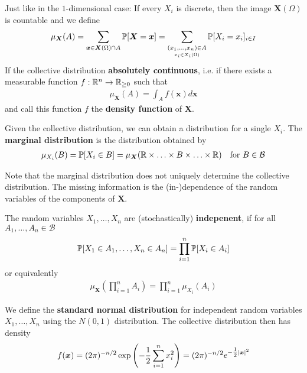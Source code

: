 Just like in the $1$-dimensional case: 
If every $X_i$ is discrete, then the image $\bm{X}(\Omega)$ is countable and we define
\begin{align*}
  \mu_{\bm{X}}(A) = \sum_{\bm{x} \in \bm{X}(\Omega) \cap A} \mathbb{P}[\bm{X} = \bm{x}] = \sum_{\underset{x_i \in X_i(\Omega)}{(x_{1}, \ldots, x_{n}) \in A}} \mathbb{P}[X_i = x_i]_{i \in I}
\end{align*}
If the collective distribution \textbf{absolutely continuous}, i.e. if there exists a measurable function $f: \mathbb{R}^{n} \to \mathbb{R}_{\geq 0}$ such that
\begin{align*}
  \mu_{\bm{X}}(A) = \int_A f(\bm{x}) d \bm{x}
\end{align*}
and call this function $f$ the \textbf{density function} of $\bm{X}$.

Given the collective distribution, we can obtain a distribution for a single $X_i$. 
The \textbf{marginal distribution} is the distribution obtained by 
\begin{align*}
  \mu_{X_i}(B) = \mathbb{P}[X_i \in B] = \mu_{\bm{X}}(\mathbb{R} \times \ldots \times B \times \ldots \times\mathbb{R}) \quad \text{for } B \in \mathcal{B}
\end{align*}

Note that the marginal distribution does not uniquely determine the collective distribution.
The missing information is the (in-)dependence of the random variables of the components of $\bm{X}$.

\begin{dfn}[]
  The random variables $X_{1}, \ldots, X_{n}$ are (stochastically) \textbf{indepenent}, if for all $A_1, \ldots, A_n \in \mathcal{B}$
  \begin{align*}
    \mathbb{P}[X_1 \in A_1, \ldots, X_n \in A_n] = \prod_{i=1}^{n}\mathbb{P}[X_i \in A_i]
  \end{align*}
  or equivalently
  \begin{align*}
    \mu_{\bm{X}}\left(\prod_{i=1}^{n}A_i\right) = \prod_{i=1}^{n} \mu_{X_i}(A_{i})
  \end{align*}
\end{dfn}


\begin{ex}[]
  We define the \textbf{standard normal distribution} for independent random variables $X_{1}, \ldots, X_{n}$ using the $N(0,1)$ distribution.
  The collective distribution then has density
  \begin{align*}
    f(\bm{x}) = (2 \pi)^{-n/2} \exp \left(
      - \frac{1}{2} \sum_{i=1}^{n} x_i^{2}
    \right)
    = (2 \pi)^{-n/2} e^{- \tfrac{1}{2}\vert\bm{x}\vert^{2}}
  \end{align*}
\end{ex}

